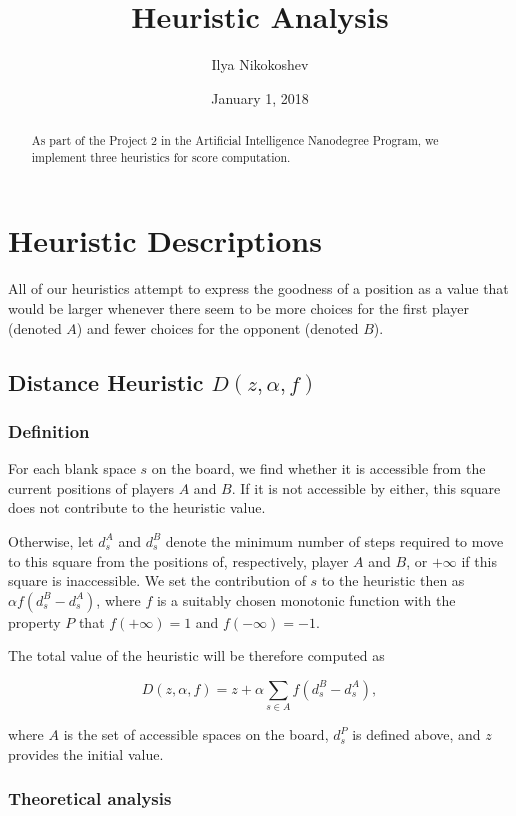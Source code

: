 \documentclass[oneside]{article}   	%
\title{Heuristic Analysis}
\author{Ilya Nikokoshev}
\date{January 1, 2018}
\begin{document}
\maketitle

\begin{abstract}
As part of the Project 2 in the Artificial Intelligence Nanodegree Program, we implement three heuristics for score computation.
\end{abstract}

\tableofcontents

\section{Heuristic Descriptions}

All of our heuristics attempt to express the goodness of a position as a value that would be larger whenever there seem to be more choices for the first player (denoted $A$) and fewer choices for the opponent (denoted $B$).


\subsection{Distance Heuristic $D(z, \alpha, f)$}

\subsubsection{Definition}

For each blank space $s$ on the board, we find whether it is accessible from the current positions of players $A$ and $B$. If it is not accessible by either, this square does not contribute to the heuristic value. 

Otherwise, let $d^A_s$ and $d^B_s$ denote the minimum number of steps required to move to this square from the positions of, respectively, player $A$ and $B$, or $+\infty$ if this square is inaccessible. We set the contribution of $s$ to the heuristic then as $\alpha f(d^B_s-d^A_s)$,
where $f$ is a suitably chosen monotonic function with the property $P$ that $f(+\infty) = 1$ and $f(-\infty) = -1$. 

The total value of the heuristic will be therefore computed as 

$$D(z, \alpha, f) = z + \alpha\sum_{s\in A}f(d^B_s-d^A_s), $$

where $A$ is the set of accessible spaces on the board, $d^P_s$ is defined above, and $z$ provides the initial value.

\subsubsection{Theoretical analysis}
\label{DistanceAnalysis}
\end{document}
